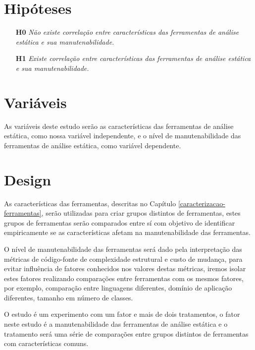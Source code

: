 \section{Hipóteses} \label{hipoteses}

\begin{enumerate}
  \item[{\bf H0}] {\em Não existe correlação entre características das
  ferramentas de análise estática e sua manutenabilidade.}
  \item[{\bf H1}] {\em Existe correlação entre características das ferramentas
  de análise estática e sua manutenabilidade.}
\end{enumerate}

\section{Variáveis}

As variáveis deste estudo serão as características das ferramentas de análise
estática, como nossa variável independente, e o nível de manutenabilidade das
ferramentas de análise estática, como variável dependente.

\section{Design}

As características das ferramentas, descritas no Capítulo \ref{caracterizacao-ferramentas},
serão utilizadas para criar grupos distintos de ferramentas, estes grupos de ferramentas
serão comparados entre sí com objetivo de identificar empiricamente se as características
afetam na manutenabilidade das ferramentas.

O nível de manutenabilidade das ferramentas será dado pela interpretação das métricas de
código-fonte de complexidade estrutural e custo de mudança, para evitar influência de fatores
conhecidos nos valores destas métricas, iremos isolar estes fatores realizando comparações
entre ferramentas com os mesmos fatores, por exemplo, comparação entre linguagens diferentes,
domínio de aplicação diferentes, tamanho em número de classes.

O estudo é um experimento com um fator e mais de dois tratamentos, o fator
neste estudo é a manutenabilidade das ferramentas de análise estática e o
tratamento será uma série de comparações entre grupos distintos de ferramentas
com características comuns.


